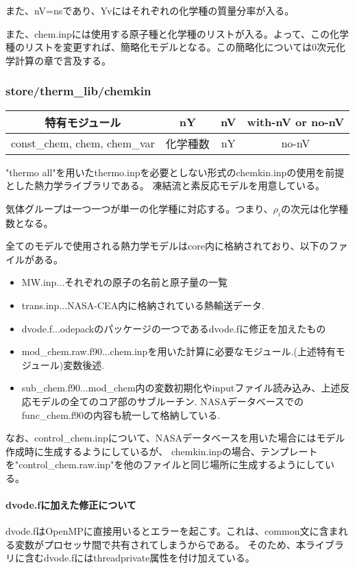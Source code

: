 \documentclass{jsarticle}
\begin{document}
また、nV=nsであり、Yvにはそれぞれの化学種の質量分率が入る。

また、chem.inpには使用する原子種と化学種のリストが入る。よって、この化学種のリストを変更すれば、簡略化モデルとなる。この簡略化については0次元化学計算の章で言及する。
\subsubsection{store/therm\_lib/chemkin}%
\begin{center}
\begin{tabular}{cccc}\hline
特有モジュール               &       nY & nV & with-nV or no-nV\\\hline \hline
const\_chem, chem, chem\_var & 化学種数 & nY & no-nV\\
\hline
\end{tabular}
\end{center}

"thermo all"を用いたthermo.inpを必要としない形式のchemkin.inpの使用を前提とした熱力学ライブラリである。
凍結流と素反応モデルを用意している。

気体グループは一つ一つが単一の化学種に対応する。つまり、$\rho _i$の次元は化学種数となる。

全てのモデルで使用される熱力学モデルはcore内に格納されており、以下のファイルがある。
\begin{itemize}
\item MW.inp...それぞれの原子の名前と原子量の一覧
\item trans.inp...NASA-CEA内に格納されている熱輸送データ.
\item dvode.f...odepackのパッケージの一つであるdvode.fに修正を加えたもの
\item mod\_chem.raw.f90...chem.inpを用いた計算に必要なモジュール.(上述特有モジュール)変数後述.
\item sub\_chem.f90...mod\_chem内の変数初期化やinputファイル読み込み、上述反応モデルの全てのコア部のサブルーチン.
NASAデータベースでのfunc\_chem.f90の内容も統一して格納している.
\end{itemize}

なお、control\_chem.inpについて、NASAデータベースを用いた場合にはモデル作成時に生成するようにしているが、
chemkin.inpの場合、テンプレートを"control\_chem.raw.inp"を他のファイルと同じ場所に生成するようにしている。

\paragraph{dvode.fに加えた修正について}%
dvode.fはOpenMPに直接用いるとエラーを起こす。これは、common文に含まれる変数がプロセッサ間で共有されてしまうからである。
そのため、本ライブラリに含むdvode.fにはthreadprivate属性を付け加えている。
\end{document}
